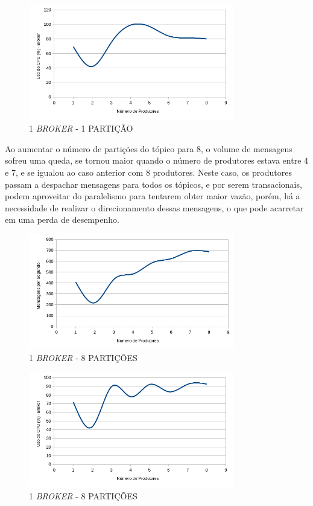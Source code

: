 \documentclass[12pt]{article}
\begin{document}
\begin{figure}[ht]
    \centering
    \includegraphics[width=0.8\textwidth]{images/graficos/g1b.png}
    \caption{1 \textit{BROKER} - 1 PARTIÇÃO}
    \label{fig:g1b}
\end{figure}
\clearpage

Ao aumentar o número de partições do tópico para 8, o volume de mensagens sofreu uma queda, se tornou maior quando o número de produtores estava entre 4 e 7, e se igualou ao caso anterior com 8 produtores. Neste caso, os produtores passam a despachar mensagens para todos os tópicos, e por serem transacionais, podem aproveitar do paralelismo para tentarem obter maior vazão, porém, há a necessidade de realizar o direcionamento dessas mensagens, o que pode acarretar em uma perda de desempenho.

\begin{figure}[ht]
    \centering
    \includegraphics[width=0.8\textwidth]{images/graficos/g2a.png}
    \caption{1 \textit{BROKER} - 8 PARTIÇÕES}
    \label{fig:g2a}
\end{figure}

\begin{figure}[ht]
    \centering
    \includegraphics[width=0.8\textwidth]{images/graficos/g2b.png}
    \caption{1 \textit{BROKER} - 8 PARTIÇÕES}
    \label{fig:g2b}
\end{figure}
\clearpage
\end{document}
